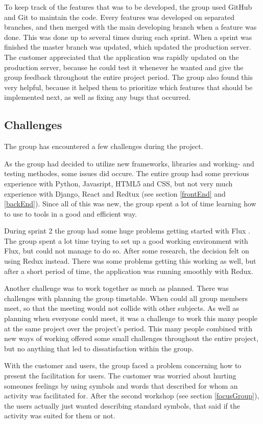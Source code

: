 To keep track of the features that was to be developed, the group used GitHub and Git to maintain the code. Every features was developed on separated branches, and then merged with the main developing branch when a feature was done. This was done up to several times during each sprint. When a sprint was finished the master branch was updated, which updated the production server. The customer appreciated that the application was rapidly updated on the production server, because he could test it whenever he wanted and give the group feedback throughout the entire project period. The group also found this very helpful, because it helped them to prioritize which features that should be implemented next, as well as fixing any bugs that occurred.


\subsection{Challenges}
The group has encountered a few challenges during the project.

As the group had decided to utilize new frameworks, libraries and working- and testing methodes, some issues did occure. The entire group had some previous experience with Python, Javasript, HTML5 and CSS, but not very much experience with Django, React and Redtux (see section \ref{frontEnd} and \ref{backEnd}). Since all of this was new, the group spent a lot of time learning how to use to tools in a good and efficient way. 

During sprint 2 the group had some huge problems getting started with Flux \cite{flux}. The group spent a lot time trying to set up a good working environment with Flux, but could not manage to do so. After some research, the decision felt on using Redux instead. There was some problems getting this working as well, but after a short period of time, the application was running smoothly with Redux. 

Another challenge was to work together as much as planned. There was challenges with planning the group timetable. When could all group members meet, so that the meeting would not collide with other subjects. As well as planning when everyone could meet, it was a challenge to work this many people at the same project over the project's period. This many people combined with new ways of working offered some small challenges throughout the entire project, but no anything that led to dissatisfaction within the group. 

With the customer and users, the group faced a problem concerning how to present the facilitation for users. The customer was worried about hurting someones feelings by using symbols and words that described for whom an activity was facilitated for. After the second workshop (see section \ref{focusGroup}), the users actually just wanted describing standard symbols, that said if the activity was suited for them or not.  

